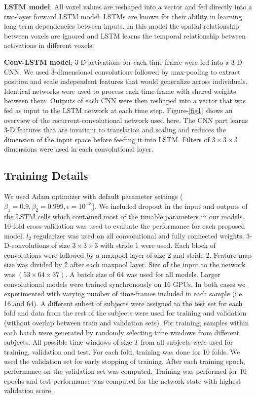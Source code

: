 \documentclass{article}
\begin{document}
\textbf{LSTM model}: All voxel values are reshaped into a vector and fed directly into a two-layer forward LSTM model. LSTMs are known for their ability in learning long-term dependencies between inputs. In this model the spatial relationship between voxels are ignored and LSTM learns the temporal relationship between activations in different voxels. 

\textbf{Conv-LSTM model}: 3-D activations for each time frame were fed into a 3-D CNN. We used 3-dimensional convolutions followed by max-pooling to extract position and scale independent features that would generalize across individuals. Identical networks were used to process each time-frame with shared weights between them. Outputs of each CNN were then reshaped into a vector that was fed as input to the LSTM network at each time step. Figure-\ref{fig1} shows an overview of the recurrent-convolutional network used here. The CNN part learns 3-D features that are invariant to translation and scaling and reduces the dimension of the input space before feeding it into LSTM. Filters of $3\times3\times3$ dimensions were used in each convolutional layer. 

\subsection{Training Details}
\label{training_details}

We used Adam optimizer with default parameter settings ($\beta_1=0.9, \beta_2=0.999, \epsilon=10^{-8}$). We included dropout in the input and outputs of the LSTM cells \citep{Zaremba2014} which contained most of the tunable parameters in our models. 
10-fold cross-validation was used to evaluate the performance for each proposed model. $l_2$ regularizer was used on all convolutional and fully connected weights. 
3-D-convolutions of size $3\times3\times3$ with stride 1 were used. Each block of convolutions were followed by a maxpool layer of size 2 and stride 2. Feature map size was divided by 2 after each maxpool layer. Size of the input to the network was $(53\times64\times37)$. 
A batch size of 64 was used for all models. Larger convolutional models were trained synchronously on 16 GPUs. In both cases we experimented with varying number of time-frames included in each sample (i.e. 16 and 64).
A different subset of subjects were assigned to the test set for each fold and data from the rest of the subjects were used for training and validation (without overlap between train and validation sets). For training, samples within each batch were generated by randomly selecting time windows from different subjects. All possible time windows of size $T$ from all subjects were used for training, validation and test. For each fold, training was done for 10 folds. We used the validation set for early stopping of training. After each training epoch, performance on the validation set was computed. Training was performed for 10 epochs and test performance was computed for the network state with highest validation score. 
\end{document}
